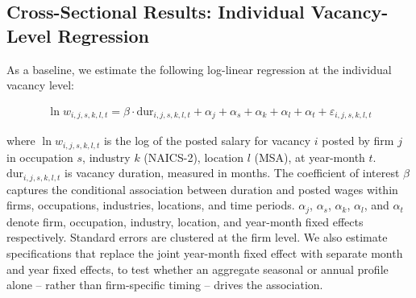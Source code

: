     
    

\subsection{Cross-Sectional Results: Individual Vacancy-Level Regression}

As a baseline, we estimate the following log-linear regression at the 
individual vacancy level:

\begin{align}
\ln w_{i,j,s,k,l,t} = \beta \cdot \text{dur}_{i,j,s,k,l,t} + \alpha_j + \alpha_s + \alpha_k + \alpha_l + \alpha_t + \varepsilon_{i,j,s,k,l,t}
\end{align}

where $\ln w_{i,j,s,k,l,t}$ is the log of the posted salary for vacancy
$i$ posted by firm $j$ in occupation $s$, industry $k$ (NAICS-2), location $l$ (MSA), at
year-month $t$. $\text{dur}_{i,j,s,k,l,t}$ is vacancy duration, measured in months. The coefficient of interest
$\beta$ captures the conditional association between duration and posted
wages within firms, occupations, industries, locations, and time periods. $\alpha_j$,
$\alpha_s$, $\alpha_k$, $\alpha_l$, and $\alpha_t$ denote firm, occupation, industry, location,
and year-month fixed effects respectively. Standard errors are clustered
at the firm level. We also estimate specifications that replace the joint year-month fixed effect with separate month and year fixed effects, to test whether an aggregate seasonal or annual profile alone -- rather than firm-specific timing -- drives the association.


